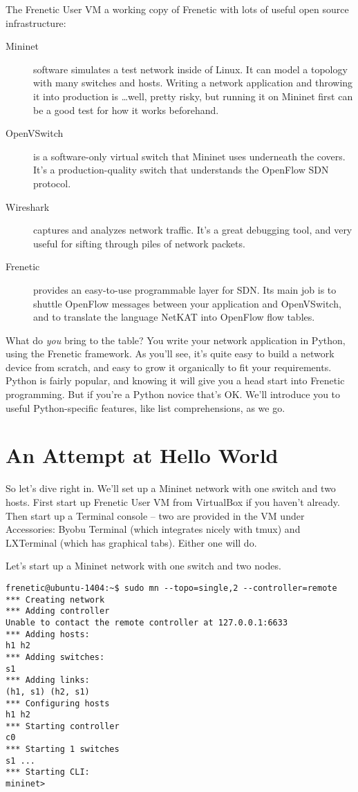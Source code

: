 The Frenetic User VM a working copy of Frenetic with lots of useful open source infrastructure:

\begin{description}
\item[Mininet] software simulates a test network inside of Linux.  
It can model a topology with many switches and hosts.  
Writing a network application and throwing it into production is \ldots well, pretty risky, but running it on Mininet first can be a good test for how it works beforehand. 
\item[OpenVSwitch] is a software-only virtual switch that Mininet uses underneath the covers.  It's a production-quality
switch that understands the OpenFlow SDN protocol. 
\item[Wireshark] captures and analyzes network traffic.  
It's a great debugging tool, and very useful for sifting through piles of network packets.
\item[Frenetic] provides an easy-to-use programmable layer for SDN.  Its main job is to shuttle OpenFlow messages between your application and OpenVSwitch, and to translate the language NetKAT into OpenFlow flow tables.
\end{description}

What do {\it you} bring to the table?  You write your network application in Python, using the Frenetic framework.  As you'll see, it's quite easy to build a network device from scratch, and easy to grow it organically to fit your requirements.  Python is fairly popular, and knowing it will give you  a head start into Frenetic programming.  But if you're a Python novice that's OK.  We'll introduce you to useful Python-specific features, like list comprehensions, as we go.  

\section{An Attempt at Hello World}

So let's dive right in.  We'll set up a Mininet network with one switch and two hosts.  
First start up Frenetic User VM from VirtualBox if you haven't already.  
Then start up a Terminal console -- two are provided in the VM under Accessories: Byobu Terminal
(which integrates nicely with tmux)
and LXTerminal (which has graphical tabs).  Either one will do.  

Let's start up a Mininet network with one switch and two nodes.

\begin{verbatim}
frenetic@ubuntu-1404:~$ sudo mn --topo=single,2 --controller=remote
*** Creating network
*** Adding controller
Unable to contact the remote controller at 127.0.0.1:6633
*** Adding hosts:
h1 h2
*** Adding switches:
s1
*** Adding links:
(h1, s1) (h2, s1)
*** Configuring hosts
h1 h2
*** Starting controller
c0
*** Starting 1 switches
s1 ...
*** Starting CLI:
mininet>
\end{verbatim}

